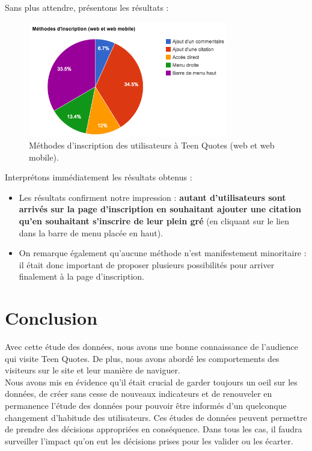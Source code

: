 \documentclass{report}
\begin{document}
	Sans plus attendre, présentons les résultats :
	\begin{figure}[H]
		\center
		\includegraphics[width=330px]{images/methodesDInscription.png}
		\caption{Méthodes d'inscription des utilisateurs à Teen Quotes (web et web mobile).}
	\end{figure}
	Interprétons immédiatement les résultats obtenus :
	\vspace{10px}
	\begin{itemize}
		\item Les résultats confirment notre impression : \textbf{autant d'utilisateurs sont arrivés sur la page d'inscription en souhaitant ajouter une citation qu'en souhaitant s'inscrire de leur plein gré} (en cliquant sur le lien dans la barre de menu placée en haut).
		\item On remarque également qu'aucune méthode n'est manifestement minoritaire : il était donc important de proposer plusieurs possibilités pour arriver finalement à la page d'inscription.
	\end{itemize}
	
	\chapter{Conclusion}
	Avec cette étude des données, nous avons une bonne connaissance de l'audience qui visite Teen Quotes. De plus, nous avons abordé les comportements des visiteurs sur le site et leur manière de naviguer.\\

	Nous avons mis en évidence qu'il était crucial de garder toujours un oeil sur les données, de créer sans cesse de nouveaux indicateurs et de renouveler en permanence l'étude des données pour pouvoir être informés d'un quelconque changement d'habitude des utilisateurs. Ces études de données peuvent permettre de prendre des décisions appropriées en conséquence. Dans tous les cas, il faudra surveiller l'impact qu'on eut les décisions prises pour les valider ou les écarter.\\
\end{document}
